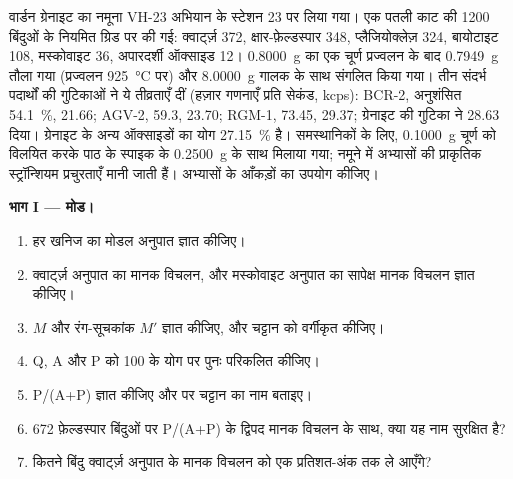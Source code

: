 \begin{problem}\label{pb:b2:field-lab-methods-2:1}
वार्डन ग्रेनाइट का नमूना VH-23 अभियान के स्टेशन 23 पर लिया गया। एक पतली काट की
1200 बिंदुओं के नियमित ग्रिड पर  की गई: क्वार्ट्ज़ 372, क्षार-फ़ेल्डस्पार 348, प्लैजियोक्लेज़ 324,
बायोटाइट 108, मस्कोवाइट 36, अपारदर्शी ऑक्साइड 12। \qty{0.8000}{g} का एक चूर्ण प्रज्वलन के बाद \qty{0.7949}{g} तौला गया
(प्रज्वलन \qty{925}{\celsius} पर) और \qty{8.0000}{g} गालक के साथ संगलित किया गया। तीन
संदर्भ पदार्थों की गुटिकाओं ने ये  तीव्रताएँ दीं (हज़ार गणनाएँ प्रति सेकंड, kcps): BCR-2,
अनुशंसित \qty{54.1}{\percent}, 21.66; AGV-2, 59.3, 23.70; RGM-1, 73.45, 29.37; ग्रेनाइट की गुटिका ने
28.63 दिया। ग्रेनाइट के अन्य ऑक्साइडों का योग \qty{27.15}{\percent} है। समस्थानिकों के लिए,
\qty{0.1000}{g} चूर्ण को विलयित करके पाठ के स्पाइक के \qty{0.2500}{g} के साथ मिलाया गया;
नमूने में अभ्यासों की प्राकृतिक स्ट्रॉन्शियम प्रचुरताएँ मानी जाती हैं। अभ्यासों के
आँकड़ों का उपयोग कीजिए।

\noindent\textbf{भाग I --- मोड।}
\begin{enumerate}
  \item हर खनिज का मोडल अनुपात ज्ञात कीजिए।
  \item क्वार्ट्ज़ अनुपात का मानक विचलन, और मस्कोवाइट अनुपात का सापेक्ष मानक विचलन
        ज्ञात कीजिए।
  \item $M$ और रंग-सूचकांक $M'$ ज्ञात कीजिए, और चट्टान को वर्गीकृत कीजिए।
  \item Q, A और P को 100 के योग पर पुनः परिकलित कीजिए।
  \item P/(A+P) ज्ञात कीजिए और  पर चट्टान का नाम बताइए।
  \item 672 फ़ेल्डस्पार बिंदुओं पर P/(A+P) के द्विपद मानक विचलन के साथ, क्या यह नाम
        सुरक्षित है?
  \item कितने बिंदु क्वार्ट्ज़ अनुपात के मानक विचलन को एक
        प्रतिशत-अंक तक ले आएँगे?
\end{enumerate}


\end{problem}
